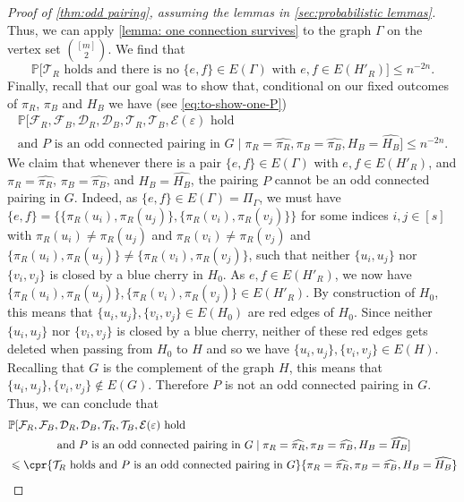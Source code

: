 \documentclass[11pt,reqno,oneside]{amsart}
\theoremstyle{definition}
\newcommand\wh[1]{\widehat{#1}}
\newcommand\1{\mathbf{1}}
\newcommand{\cE}{\mathcal{E}}
\newcommand{\eps}{\varepsilon}
\let\leq\leqslant
\begin{document}
\begin{proof}[Proof of \cref{thm:odd pairing}, assuming the lemmas in \cref{sec:probabilistic lemmas}]
    Thus, we can apply \cref{lemma: one connection survives} to the graph $\Gamma$ on the vertex set $\binom{[m]}{2}$. We find that
    \begin{equation}\label{eq:conclusion-lemma-44}
    \mathbb P\big[\mathcal T_R\text{ holds and there is no }\{e,f\} \in E(\Gamma)\text{ with }e,f \in E(H'_R)\big] \leq n^{-2n}.
     \end{equation}
    Finally, recall that our goal was to show that, conditional on our fixed outcomes of $\pi_R$, $\pi_B$ and $H_B$ we have (see \cref{eq:to-show-one-P})
    \begin{multline*}
    \mathbb{P}[\mathcal F_R, \mathcal F_B, \mathcal D_R, \mathcal D_B, \mathcal T_R, \mathcal T_B, \cE(\eps)\text{ hold}\\
    \text{and }P\text{ is an odd connected pairing in }G\mid\pi_R=\wh{\pi_R},\pi_B=\wh{\pi_B},H_B=\wh{H_B}]\leq n^{-2n}.
    \end{multline*}
    We claim that whenever there is a pair $\{e,f\} \in E(\Gamma)$ with $e,f \in E(H'_R)$, and $\pi_R=\wh{\pi_R}$, $\pi_B=\wh{\pi_B}$, and $H_B=\wh{H_B}$, the pairing $P$ cannot be an odd connected pairing in $G$. Indeed, as $\{e,f\} \in E(\Gamma)=\Pi_\Gamma$, we must have $\{e,f\}=\big\{\{\pi_R(u_i),\pi_R(u_j)\}, \{\pi_R(v_i),\pi_R(v_j)\}\big\}$ for some indices $i,j\in [s]$ with $\pi_R(u_i)\ne\pi_R(u_j)$ and $\pi_R(v_i)\ne\pi_R(v_j)$ and $\{\pi_R(u_i),\pi_R(u_j)\}\ne \{\pi_R(v_i),\pi_R(v_j)\}$, such that neither $\{u_i,u_j\}$ nor $\{v_i,v_j\}$ is closed by a blue cherry in $H_0$. As $e,f \in E(H'_R)$, we now have $\{\pi_R(u_i),\pi_R(u_j)\}, \{\pi_R(v_i),\pi_R(v_j)\}\in E(H'_R)$. By construction of $H_0$, this means that $\{u_i,u_j\}, \{v_i,v_j\}\in E(H_0)$ are red edges of $H_0$. Since neither $\{u_i,u_j\}$ nor $\{v_i,v_j\}$ is closed by a blue cherry, neither of these red edges gets deleted when passing from $H_0$ to $H$ and so we have $\{u_i,u_j\}, \{v_i,v_j\}\in E(H)$. Recalling that $G$ is the complement of the graph $H$, this means that $\{u_i,u_j\}, \{v_i,v_j\}\not\in E(G)$. Therefore $P$ is not an odd connected pairing in $G$. Thus, we can conclude that
    \begin{align*}
        &\mathbb P[\mathcal F_R, \mathcal F_B, \mathcal D_R, \mathcal D_B, \mathcal T_R, \mathcal T_B, \cE(\eps)\text{ hold}\\
        &\qquad\qquad\text{ and }P\text{ is an odd connected pairing in }G \mid {\pi_R=\wh{\pi_R},\pi_B=\wh{\pi_B},H_B=\wh{H_B}}]\\
        &\leq \cpr{\mathcal T_R\text{ holds and }P\text{ is an odd connected pairing in }G}{\pi_R=\wh{\pi_R},\pi_B=\wh{\pi_B},H_B=\wh{H_B}}\\

\end{align*}
\end{proof}
\end{document}
